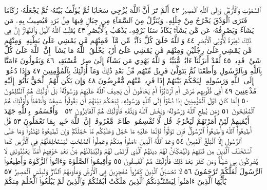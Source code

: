 ٱلسَّمَٰوَٰتِ وَٱلْأَرْضِۖ وَإِلَى ٱللَّهِ ٱلْمَصِيرُ ٤٢ أَلَمْ تَرَ أَنَّ ٱللَّهَ يُزْجِي
سَحَابࣰا ثُمَّ يُؤَلِّفُ بَيْنَهُۥ ثُمَّ يَجْعَلُهُۥ رُكَامࣰا فَتَرَى ٱلْوَدْقَ يَخْرُجُ مِنْ
خِلَٰلِهِۦ وَيُنَزِّلُ مِنَ ٱلسَّمَآءِ مِن جِبَالࣲ فِيهَا مِنۢ بَرَدࣲ فَيُصِيبُ بِهِۦ مَن يَشَآءُ
وَيَصْرِفُهُۥ عَن مَّن يَشَآءُۖ يَكَادُ سَنَا بَرْقِهِۦ يَذْهَبُ بِٱلْأَبْصَٰرِ ٤٣
يُقَلِّبُ ٱللَّهُ ٱلَّيْلَ وَٱلنَّهَارَۚ إِنَّ فِي ذَٰلِكَ لَعِبْرَةࣰ لِّأُو۟لِي ٱلْأَبْصَٰرِ ٤٤
وَٱللَّهُ خَلَقَ كُلَّ دَآبَّةࣲ مِّن مَّآءࣲۖ فَمِنْهُم مَّن يَمْشِي عَلَىٰ بَطْنِهِۦ وَمِنْهُم مَّن
يَمْشِي عَلَىٰ رِجْلَيْنِ وَمِنْهُم مَّن يَمْشِي عَلَىٰٓ أَرْبَعࣲۚ يَخْلُقُ ٱللَّهُ مَا يَشَآءُۚ
إِنَّ ٱللَّهَ عَلَىٰ كُلِّ شَيْءࣲ قَدِيرࣱ ٤٥ لَّقَدْ أَنزَلْنَآ ءَايَٰتࣲ مُّبَيِّنَٰتࣲۚ
وَٱللَّهُ يَهْدِي مَن يَشَآءُ إِلَىٰ صِرَٰطࣲ مُّسْتَقِيمࣲ ٤٦ وَيَقُولُونَ
ءَامَنَّا بِٱللَّهِ وَبِٱلرَّسُولِ وَأَطَعْنَا ثُمَّ يَتَوَلَّىٰ فَرِيقࣱ مِّنْهُم مِّنۢ بَعْدِ
ذَٰلِكَۚ وَمَآ أُو۟لَٰٓئِكَ بِٱلْمُؤْمِنِينَ ٤٧ وَإِذَا دُعُوٓا۟ إِلَى ٱللَّهِ وَرَسُولِهِۦ
لِيَحْكُمَ بَيْنَهُمْ إِذَا فَرِيقࣱ مِّنْهُم مُّعْرِضُونَ ٤٨ وَإِن يَكُن لَّهُمُ ٱلْحَقُّ
يَأْتُوٓا۟ إِلَيْهِ مُذْعِنِينَ ٤٩ أَفِي قُلُوبِهِم مَّرَضٌ أَمِ ٱرْتَابُوٓا۟ أَمْ يَخَافُونَ
أَن يَحِيفَ ٱللَّهُ عَلَيْهِمْ وَرَسُولُهُۥۚ بَلْ أُو۟لَٰٓئِكَ هُمُ ٱلظَّٰلِمُونَ ٥٠ إِنَّمَا
كَانَ قَوْلَ ٱلْمُؤْمِنِينَ إِذَا دُعُوٓا۟ إِلَى ٱللَّهِ وَرَسُولِهِۦ لِيَحْكُمَ بَيْنَهُمْ أَن
يَقُولُوا۟ سَمِعْنَا وَأَطَعْنَاۚ وَأُو۟لَٰٓئِكَ هُمُ ٱلْمُفْلِحُونَ ٥١ وَمَن
يُطِعِ ٱللَّهَ وَرَسُولَهُۥ وَيَخْشَ ٱللَّهَ وَيَتَّقْهِ فَأُو۟لَٰٓئِكَ هُمُ ٱلْفَآئِزُونَ ٥٢
۞ وَأَقْسَمُوا۟ بِٱللَّهِ جَهْدَ أَيْمَٰنِهِمْ لَئِنْ أَمَرْتَهُمْ لَيَخْرُجُنَّۖ قُل
لَّا تُقْسِمُوا۟ۖ طَاعَةࣱ مَّعْرُوفَةٌۚ إِنَّ ٱللَّهَ خَبِيرُۢ بِمَا تَعْمَلُونَ ٥٣
قُلْ أَطِيعُوا۟ ٱللَّهَ وَأَطِيعُوا۟ ٱلرَّسُولَۖ فَإِن تَوَلَّوْا۟ فَإِنَّمَا عَلَيْهِ مَا حُمِّلَ
وَعَلَيْكُم مَّا حُمِّلْتُمْۖ وَإِن تُطِيعُوهُ تَهْتَدُوا۟ۚ وَمَا عَلَى ٱلرَّسُولِ
إِلَّا ٱلْبَلَٰغُ ٱلْمُبِينُ ٥٤ وَعَدَ ٱللَّهُ ٱلَّذِينَ ءَامَنُوا۟ مِنكُمْ وَعَمِلُوا۟
ٱلصَّٰلِحَٰتِ لَيَسْتَخْلِفَنَّهُمْ فِي ٱلْأَرْضِ كَمَا ٱسْتَخْلَفَ
ٱلَّذِينَ مِن قَبْلِهِمْ وَلَيُمَكِّنَنَّ لَهُمْ دِينَهُمُ ٱلَّذِي ٱرْتَضَىٰ
لَهُمْ وَلَيُبَدِّلَنَّهُم مِّنۢ بَعْدِ خَوْفِهِمْ أَمْنࣰاۚ يَعْبُدُونَنِي لَا يُشْرِكُونَ
بِي شَيْـࣰٔاۚ وَمَن كَفَرَ بَعْدَ ذَٰلِكَ فَأُو۟لَٰٓئِكَ هُمُ ٱلْفَٰسِقُونَ ٥٥
وَأَقِيمُوا۟ ٱلصَّلَوٰةَ وَءَاتُوا۟ ٱلزَّكَوٰةَ وَأَطِيعُوا۟ ٱلرَّسُولَ لَعَلَّكُمْ
تُرْحَمُونَ ٥٦ لَا تَحْسَبَنَّ ٱلَّذِينَ كَفَرُوا۟ مُعْجِزِينَ فِي ٱلْأَرْضِۚ
وَمَأْوَىٰهُمُ ٱلنَّارُۖ وَلَبِئْسَ ٱلْمَصِيرُ ٥٧ يَٰٓأَيُّهَا ٱلَّذِينَ ءَامَنُوا۟
لِيَسْتَـْٔذِنكُمُ ٱلَّذِينَ مَلَكَتْ أَيْمَٰنُكُمْ وَٱلَّذِينَ لَمْ يَبْلُغُوا۟ ٱلْحُلُمَ مِنكُمْ
